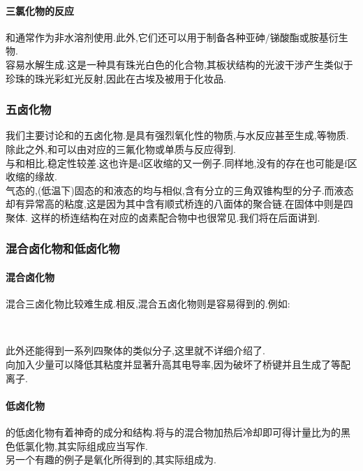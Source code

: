 \documentclass{ctexart}
\begin{document}
\paragraph{三氯化物的反应}
和通常作为非水溶剂使用.此外,它们还可以用于制备各种亚砷/锑酸酯或胺基衍生物.\\
\indent {}容易水解生成.这是一种具有珠光白色的化合物,其板状结构的光波干涉产生类似于珍珠的珠光彩虹光反射,因此在古埃及被用于化妆品.
\subsubsection{五卤化物}
我们主要讨论和的五卤化物.是具有强烈氧化性的物质,与水反应甚至生成,等物质.\\
\indent 除此之外,和可以由对应的三氟化物或单质与反应得到.\\
\indent 与和相比,稳定性较差.这也许是d区收缩的又一例子.同样地,没有的存在也可能是f区收缩的缘故.\\
\indent 气态的,(低温下)固态的和液态的均与相似,含有分立的三角双锥构型的分子.而液态却有异常高的粘度,这是因为其中含有顺式桥连的八面体的聚合链.在固体中则是四聚体.
这样的桥连结构在对应的卤素配合物中也很常见.我们将在后面讲到.
\subsubsection{混合卤化物和低卤化物}
\paragraph{混合卤化物}
混合三卤化物比较难生成.相反,混合五卤化物则是容易得到的.例如:
\begin{center}
    \\
\end{center}
此外还能得到一系列四聚体的类似分子,这里就不详细介绍了.\\
\indent 向加入少量可以降低其粘度并显著升高其电导率,因为破坏了桥键并且生成了\ce{[SbF5Cl]-}等配离子.
\paragraph{低卤化物}
的低卤化物有着神奇的成分和结构.将与的混合物加热后冷却即可得计量比为的黑色低氯化物,其实际组成应当写作.\\
\indent 另一个有趣的例子是氧化所得到的,其实际组成为.
\end{document}
